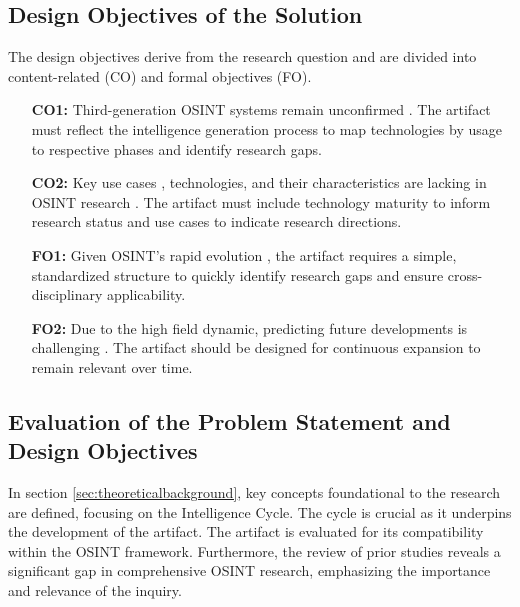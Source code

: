 \documentclass[10pt]{article}
\begin{document}
\subsection{Design Objectives of the Solution} \label{sec:designobjectives}


The design objectives derive from the research question \cite{Peffers.2007} and are divided into content-related (CO) and formal objectives (FO).

\begin{itemize}
    \item[\textbf{CO1:}] Third-generation OSINT systems remain unconfirmed \cite{Ghioni.2023}. The artifact must reflect the intelligence generation process to map technologies by usage to respective phases and identify research gaps.
    \item[\textbf{CO2:}] Key use cases \cite{AlKilani.2021}, technologies, and their characteristics are lacking in OSINT research \cite{Ghioni.2023,Ish.2022}. The artifact must include technology maturity to inform research status and use cases to indicate research directions.
    \item[\textbf{FO1:}] Given OSINT's rapid evolution \cite{Ghioni.2023}, the artifact requires a simple, standardized structure to quickly identify research gaps and ensure cross-disciplinary applicability.
    \item[\textbf{FO2:}] Due to the high field dynamic, predicting future developments is challenging \cite{Benes.2013}. The artifact should be designed for continuous expansion to remain relevant over time.
\end{itemize}

\subsection{Evaluation of the Problem Statement and Design Objectives} \label{sec:eval}
In section \ref{sec:theoreticalbackground}, key concepts foundational to the research are defined, focusing on the Intelligence Cycle. The cycle is crucial as it underpins the development of the artifact. The artifact is evaluated for its compatibility within the OSINT framework. Furthermore, the review of prior studies reveals a significant gap in comprehensive OSINT research, emphasizing the importance and relevance of the inquiry.
\end{document}
